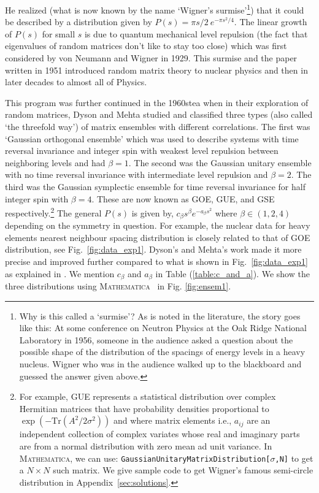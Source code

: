 \documentclass[11pt]{article}
\newcommand{\MA}{\textsc{Mathematica}}
\begin{document}
He realized (what is now known by the name `Wigner's surmise'\footnote{Why is this called a `surmise'? 
As is noted in the literature, the story goes like this: At some conference on Neutron Physics at the Oak 
Ridge National Laboratory in 1956, someone in the audience asked a question about the possible shape 
of the distribution of the spacings of energy levels in a heavy nucleus. Wigner who was in the audience 
walked up to the blackboard and guessed the answer given above.}) that it could be described by a distribution given by $P(s) = \pi s/2~e^{-\pi s^2/4}$. 
The linear growth of $P(s)$ for small $s$ is due to quantum mechanical level repulsion (the fact that eigenvalues of random matrices don't like to stay too close)
which was first considered by von Neumann and Wigner in 1929. 
This surmise and the paper written in 1951
\cite{Wigner1951OnTS} introduced random matrix theory 
to nuclear physics and then in later decades to almost all of Physics.

This program was further continued in the 1960stea when in their exploration of random matrices, 
Dyson and Mehta studied and classified three types (also called `the threefold way') 
of matrix ensembles with different correlations. The first was `Gaussian orthogonal ensemble' which was used to describe systems with time reversal invariance and integer spin with weakest level repulsion between neighboring levels and had $\beta=1$. The second was the Gaussian unitary ensemble with no time reversal invariance with intermediate level repulsion and $\beta=2$. The third was the Gaussian symplectic ensemble for time reversal invariance for half integer spin with $\beta=4$. These are now known as GOE, GUE, and GSE respectively.\footnote{For example, GUE represents a statistical distribution over complex Hermitian matrices 
that have probability densities proportional to $ \exp(-\mbox{Tr}(A^2/2\sigma^2))$ and
where matrix elements i.e., $a_{ij}$ are an independent collection of complex 
variates whose real and imaginary parts are from a normal distribution
with zero mean ad unit variance. In \MA, we can use: 
\texttt{GaussianUnitaryMatrixDistribution[$\sigma$,N]}
to get a $N \times N$ such matrix. We give sample code to get Wigner's famous semi-circle
distribution in Appendix~\ref{sec:solutions}.} 
The general $P(s)$ is given by, $c_{\beta}s^{\beta} e^{-a_{\beta}s^2}$ 
where $\beta \in (1,2,4)$ depending on the symmetry in question. 
For example, the nuclear data for heavy elements nearest neighbour spacing distribution
is closely related to that of GOE distribution, see Fig.~\ref{fig:data_exp1}. 
Dyson's and Mehta's work made it more precise and improved further 
compared to what is shown in Fig.~\ref{fig:data_exp1} as explained in 
\cite{PhysRevLett.48.1086}. We mention $c_{\beta}$ and  $a_{\beta}$ in Table (\ref{table:c_and_a}). 
We show the three distributions using \MA~ in Fig. \ref{fig:ensem1}.  
\end{document}
